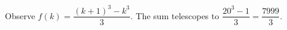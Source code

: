 Observe $f(k)=\dfrac{(k+1)^3-k^3}{3}$. The sum telescopes to $\dfrac{20^3-1}{3}=\boxed{\dfrac{7999}{3}}$.
